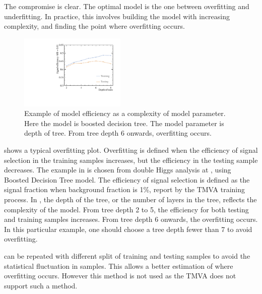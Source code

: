 The compromise is clear. The optimal model is the one between overfitting and underfitting. In practice, this involves building the model with increasing complexity, and finding the point where overfitting occurs.

\begin{figure}[!tbp]
\includegraphics[width=0.45\textwidth]{doubleHiggs/DepthOfTrees.pdf}
\caption{Example of model efficiency as a complexity of model parameter. Here the model is boosted decision tree. The model parameter is depth of tree. From tree depth 6 onwards, overfitting occurs.}
\label{fig:doubleHiggsMVAovertraining}
\end{figure}

 shows a typical overfitting plot. Overfitting is defined when the efficiency of signal selection in the training samples increases, but the efficiency in the testing sample decreases. The example in   is chosen from double Higgs analysis at , using Boosted Decision Tree model. The efficiency of signal selection is defined as the signal fraction when background fraction is 1\%, report by the TMVA training process. In  , the depth of the tree, or the number of layers in the tree, reflects the complexity of the model. From tree depth 2 to 5, the efficiency for both testing and training samples increases. From tree depth 6 onwards, the overfitting occurs. In this particular example, one should choose a tree depth fewer than 7 to avoid overfitting.

  can be repeated with different split of training and testing samples to avoid the statistical fluctuation in samples. This allows a better estimation of where overfitting occurs. However this method is not used as the TMVA does not support such a method.



